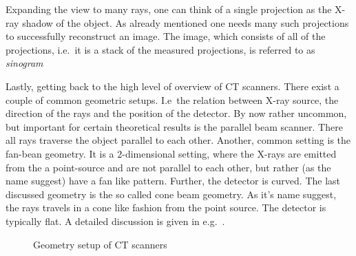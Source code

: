 Expanding the view to many rays, one can think of a single projection as the X-ray shadow of the
object. As already mentioned one needs many such projections to successfully reconstruct an image.
The image, which consists of all of the projections, i.e.\ it is a stack of the measured
projections, is referred to as \textit{sinogram}


Lastly, getting back to the high level of overview of CT scanners. There exist a couple of common
geometric setups. I.e\ the relation between X-ray source, the direction of the rays and the position
of the detector. By now rather uncommon, but important for certain theoretical results is the
parallel beam scanner. There all rays traverse the object parallel to each other. Another, common
setting is the fan-bean geometry. It is a \(2\)-dimensional setting, where the X-rays are emitted
from the a point-source and are not parallel to each other, but rather (as the name suggest) have a
fan like pattern. Further, the detector is curved. The last discussed geometry is the so called cone
beam geometry. As it's name suggest, the rays travels in a cone like fashion from the point source.
The detector is typically flat. A detailed discussion is given in e.g.~\cite{buzug_computed_2008}.

\begin{figure}[t]
	\centering

	\caption{Geometry setup of CT scanners}\label{fig:ct_geometry_setup}
\end{figure}

